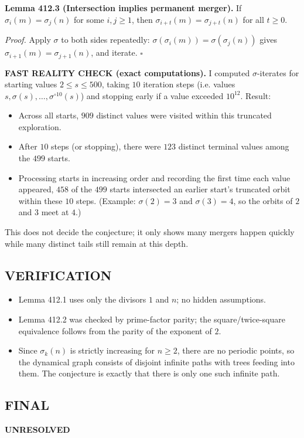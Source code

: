 \textbf{Lemma 412.3 (Intersection implies permanent merger).}
If $\sigma_i(m)=\sigma_j(n)$ for some $i,j\ge1$, then $\sigma_{i+t}(m)=\sigma_{j+t}(n)$ for all $t\ge0$.

\textit{Proof.}
Apply $\sigma$ to both sides repeatedly: $\sigma(\sigma_i(m))=\sigma(\sigma_j(n))$ gives $\sigma_{i+1}(m)=\sigma_{j+1}(n)$, and iterate.
\hfill$\square$

\textbf{FAST REALITY CHECK (exact computations).}
I computed $\sigma$-iterates for starting values $2\le s\le 500$, taking $10$ iteration steps (i.e. values $s,\sigma(s),\dots,\sigma^{\circ 10}(s)$) and stopping early if a value exceeded $10^{12}$.
Result:
\begin{itemize}
  \item Across all starts, $909$ distinct values were visited within this truncated exploration.
  \item After $10$ steps (or stopping), there were $123$ distinct terminal values among the $499$ starts.
  \item Processing starts in increasing order and recording the first time each value appeared, $458$ of the $499$ starts intersected an earlier start's truncated orbit within these $10$ steps. (Example: $\sigma(2)=3$ and $\sigma(3)=4$, so the orbits of $2$ and $3$ meet at $4$.)
\end{itemize}
This does not decide the conjecture; it only shows many mergers happen quickly while many distinct tails still remain at this depth.

\subsection*{VERIFICATION}
\begin{itemize}
  \item Lemma 412.1 uses only the divisors $1$ and $n$; no hidden assumptions.
  \item Lemma 412.2 was checked by prime-factor parity; the square/twice-square equivalence follows from the parity of the exponent of $2$.
  \item Since $\sigma_k(n)$ is strictly increasing for $n\ge2$, there are no periodic points, so the dynamical graph consists of disjoint infinite paths with trees feeding into them. The conjecture is exactly that there is only one such infinite path.
\end{itemize}

\subsection*{FINAL}
\textbf{UNRESOLVED}

